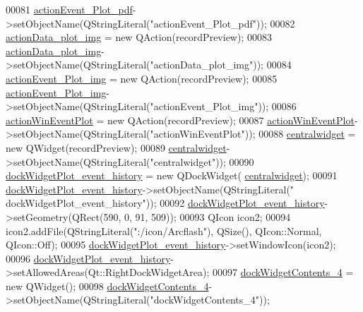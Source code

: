 \begin{DoxyCode}
00081         \hyperlink{a00028_a4369770edbf9cb6131a066ca10b3f863}{actionEvent\_Plot\_pdf}->setObjectName(QStringLiteral(\textcolor{stringliteral}{"actionEvent\_Plot\_pdf"}));
00082         \hyperlink{a00028_ae841c150cf6131bef2e8d12da0401ce2}{actionData\_plot\_img} = \textcolor{keyword}{new} QAction(recordPreview);
00083         \hyperlink{a00028_ae841c150cf6131bef2e8d12da0401ce2}{actionData\_plot\_img}->setObjectName(QStringLiteral(\textcolor{stringliteral}{"actionData\_plot\_img"}));
00084         \hyperlink{a00028_a789f5466c7f1781c13d4d027e982ca55}{actionEvent\_Plot\_img} = \textcolor{keyword}{new} QAction(recordPreview);
00085         \hyperlink{a00028_a789f5466c7f1781c13d4d027e982ca55}{actionEvent\_Plot\_img}->setObjectName(QStringLiteral(\textcolor{stringliteral}{"actionEvent\_Plot\_img"}));
00086         \hyperlink{a00028_ac72ec9c8679d46fd43a87f99ee6db893}{actionWinEventPlot} = \textcolor{keyword}{new} QAction(recordPreview);
00087         \hyperlink{a00028_ac72ec9c8679d46fd43a87f99ee6db893}{actionWinEventPlot}->setObjectName(QStringLiteral(\textcolor{stringliteral}{"actionWinEventPlot"}));
00088         \hyperlink{a00028_ac9ab4609922159e8e4cc45905f76928e}{centralwidget} = \textcolor{keyword}{new} QWidget(recordPreview);
00089         \hyperlink{a00028_ac9ab4609922159e8e4cc45905f76928e}{centralwidget}->setObjectName(QStringLiteral(\textcolor{stringliteral}{"centralwidget"}));
00090         \hyperlink{a00028_a2a8f7ee8d4458dd20481c8a1c29ce185}{dockWidgetPlot\_event\_history} = \textcolor{keyword}{new} QDockWidget(
      \hyperlink{a00028_ac9ab4609922159e8e4cc45905f76928e}{centralwidget});
00091         \hyperlink{a00028_a2a8f7ee8d4458dd20481c8a1c29ce185}{dockWidgetPlot\_event\_history}->setObjectName(QStringLiteral(\textcolor{stringliteral}{"
      dockWidgetPlot\_event\_history"}));
00092         \hyperlink{a00028_a2a8f7ee8d4458dd20481c8a1c29ce185}{dockWidgetPlot\_event\_history}->setGeometry(QRect(590, 0, 91, 509));
00093         QIcon icon2;
00094         icon2.addFile(QStringLiteral(\textcolor{stringliteral}{":/icon/Arcflash"}), QSize(), QIcon::Normal, QIcon::Off);
00095         \hyperlink{a00028_a2a8f7ee8d4458dd20481c8a1c29ce185}{dockWidgetPlot\_event\_history}->setWindowIcon(icon2);
00096         \hyperlink{a00028_a2a8f7ee8d4458dd20481c8a1c29ce185}{dockWidgetPlot\_event\_history}->setAllowedAreas(Qt::RightDockWidgetArea);
00097         \hyperlink{a00028_a538c2b98d6f228a073dea0a3ddb4350e}{dockWidgetContents\_4} = \textcolor{keyword}{new} QWidget();
00098         \hyperlink{a00028_a538c2b98d6f228a073dea0a3ddb4350e}{dockWidgetContents\_4}->setObjectName(QStringLiteral(\textcolor{stringliteral}{"dockWidgetContents\_4"}));

\end{DoxyCode}
